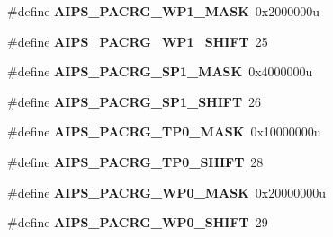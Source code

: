 \begin{DoxyCompactItemize}
\item 
\hypertarget{group___a_i_p_s___register___masks_gada02be7d1abce772ece312977971f0b4}{}\#define {\bfseries A\+I\+P\+S\+\_\+\+P\+A\+C\+R\+G\+\_\+\+W\+P1\+\_\+\+M\+A\+S\+K}~0x2000000u\label{group___a_i_p_s___register___masks_gada02be7d1abce772ece312977971f0b4}

\item 
\hypertarget{group___a_i_p_s___register___masks_ga9f3767d4fcaafb07c9200d81a6a24bd3}{}\#define {\bfseries A\+I\+P\+S\+\_\+\+P\+A\+C\+R\+G\+\_\+\+W\+P1\+\_\+\+S\+H\+I\+F\+T}~25\label{group___a_i_p_s___register___masks_ga9f3767d4fcaafb07c9200d81a6a24bd3}

\item 
\hypertarget{group___a_i_p_s___register___masks_gae5e243cd7212a8b1214be24d78005b09}{}\#define {\bfseries A\+I\+P\+S\+\_\+\+P\+A\+C\+R\+G\+\_\+\+S\+P1\+\_\+\+M\+A\+S\+K}~0x4000000u\label{group___a_i_p_s___register___masks_gae5e243cd7212a8b1214be24d78005b09}

\item 
\hypertarget{group___a_i_p_s___register___masks_ga079300e6e5872ceb463b2b51a5272076}{}\#define {\bfseries A\+I\+P\+S\+\_\+\+P\+A\+C\+R\+G\+\_\+\+S\+P1\+\_\+\+S\+H\+I\+F\+T}~26\label{group___a_i_p_s___register___masks_ga079300e6e5872ceb463b2b51a5272076}

\item 
\hypertarget{group___a_i_p_s___register___masks_gae025e267c4a27be7a58990361788f39b}{}\#define {\bfseries A\+I\+P\+S\+\_\+\+P\+A\+C\+R\+G\+\_\+\+T\+P0\+\_\+\+M\+A\+S\+K}~0x10000000u\label{group___a_i_p_s___register___masks_gae025e267c4a27be7a58990361788f39b}

\item 
\hypertarget{group___a_i_p_s___register___masks_ga1aa2552c72fd7b2bd6f6909e23e58fd7}{}\#define {\bfseries A\+I\+P\+S\+\_\+\+P\+A\+C\+R\+G\+\_\+\+T\+P0\+\_\+\+S\+H\+I\+F\+T}~28\label{group___a_i_p_s___register___masks_ga1aa2552c72fd7b2bd6f6909e23e58fd7}

\item 
\hypertarget{group___a_i_p_s___register___masks_gaec93d2d689588913e595fb43f40f093a}{}\#define {\bfseries A\+I\+P\+S\+\_\+\+P\+A\+C\+R\+G\+\_\+\+W\+P0\+\_\+\+M\+A\+S\+K}~0x20000000u\label{group___a_i_p_s___register___masks_gaec93d2d689588913e595fb43f40f093a}

\item 
\hypertarget{group___a_i_p_s___register___masks_ga0003fbf3eef9b2c8e4f741ef0f3275de}{}\#define {\bfseries A\+I\+P\+S\+\_\+\+P\+A\+C\+R\+G\+\_\+\+W\+P0\+\_\+\+S\+H\+I\+F\+T}~29\label{group___a_i_p_s___register___masks_ga0003fbf3eef9b2c8e4f741ef0f3275de}


\end{DoxyCompactItemize}
